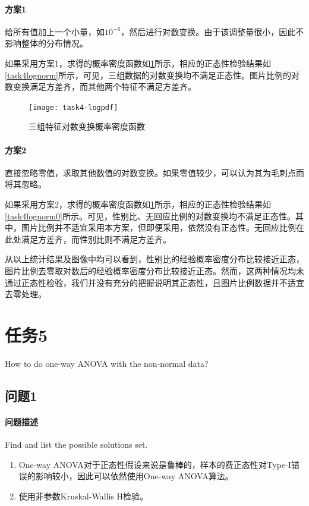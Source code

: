 \documentclass[a4paper,12pt]{article}
\begin{document}
    \paragraph{方案1} 给所有值加上一个小量，如$10^{-6}$，然后进行对数变换。由于该调整量很小，因此不影响整体的分布情况。

    如果采用方案1，求得的概率密度函数如\cref{fig:task4loggnn}所示，相应的正态性检验结果如\cref{task4lognorm}所示，可见，三组数据的对数变换均不满足正态性。图片比例的对数变换满足方差齐，而其他两个特征不满足方差齐。

    \begin{figure}
      \centering
      \texttt{[image: task4-logpdf]}
      \caption{三组特征对数变换概率密度函数}
      \label{fig:task4loggnn}
    \end{figure}

    
    \paragraph{方案2} 直接忽略零值，求取其他数值的对数变换。如果零值较少，可以认为其为毛刺点而将其忽略。

    如果采用方案2，求得的概率密度函数如\cref{fig:task4loggnn}所示，相应的正态性检验结果如\cref{task4lognorm0}所示。可见，性别比、无回应比例的对数变换均不满足正态性。其中，图片比例并不适宜采用本方案，但即便采用，依然没有正态性。无回应比例在此处满足方差齐，而性别比则不满足方差齐。

    

    从以上统计结果及图像中均可以看到，性别比的经验概率密度分布比较接近正态，图片比例去零取对数后的经验概率密度分布比较接近正态。然而，这两种情况均未通过正态性检验，我们并没有充分的把握说明其正态性，且图片比例数据并不适宜去零处理。
    \section{任务5} %
    How to do one-way ANOVA with the non-normal data?
    \subsection{问题1} %
    \paragraph{问题描述} Find and list the possible solutions set.
    \begin{enumerate}
      \item One-way ANOVA对于正态性假设来说是鲁棒的，样本的费正态性对Type-I错误的影响较小，因此可以依然使用One-way ANOVA算法。
      \item 使用非参数Kruskal-Wallis H检验。
    \end{enumerate}
\end{document}

